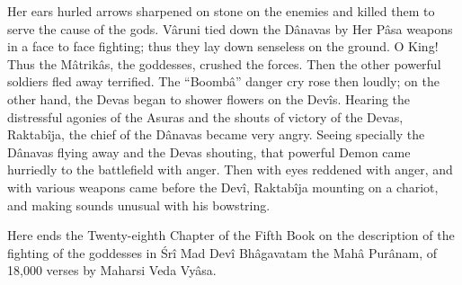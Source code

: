 Her ears hurled arrows sharpened on stone on the enemies and killed them to serve the cause of the gods. V\^aruni tied down the D\^anavas by Her P\^asa weapons in a face to face fighting; thus they lay down senseless on the ground. O King! Thus the M\^atrik\^as, the goddesses, crushed the forces. Then the other powerful soldiers fled away terrified. The ``Boomb\^a'' danger cry rose then loudly; on the other hand, the Devas began to shower flowers on the Dev\^is. Hearing the distressful agonies of the Asuras and the shouts of victory of the Devas, Raktab\^ija, the chief of the D\^anavas became very angry. Seeing specially the D\^anavas flying away and the Devas shouting, that powerful Demon came hurriedly to the battlefield with anger. Then with eyes reddened with anger, and with various weapons came before the Dev\^i, Raktab\^ija mounting on a chariot, and making sounds unusual with his bowstring.

Here ends the Twenty-eighth Chapter of the Fifth Book on the description of the fighting of the goddesses in \'Sr\^i Mad Dev\^i Bh\^agavatam the Mah\^a Pur\^anam, of 18,000 verses by Maharsi Veda Vy\^asa.


